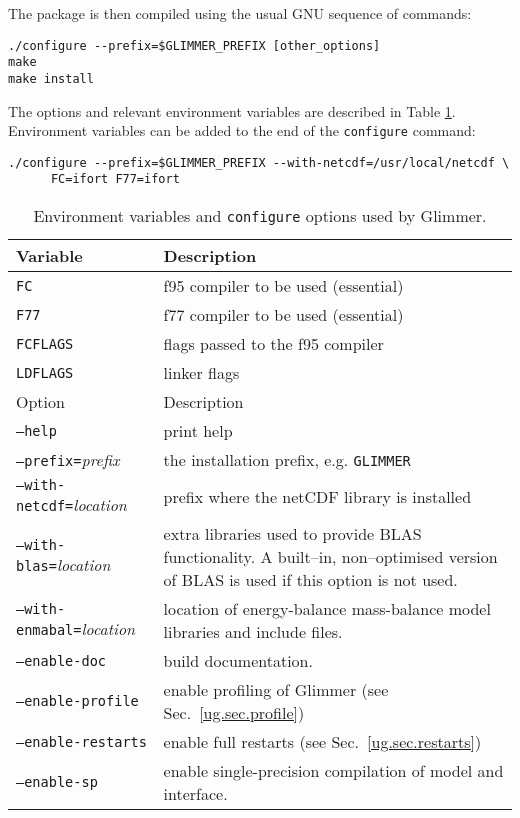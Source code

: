 The package is then compiled using the usual GNU sequence of commands:
\begin{verbatim}
./configure --prefix=$GLIMMER_PREFIX [other_options]
make
make install
\end{verbatim} %
%
The options and relevant environment variables are described in Table
\ref{ug.tab.env}. Environment variables can be added to the end of the
\texttt{configure} command:
%
\begin{verbatim}
./configure --prefix=$GLIMMER_PREFIX --with-netcdf=/usr/local/netcdf \
      FC=ifort F77=ifort
\end{verbatim} %
%
\begin{table}[htbp]
  \centering
  \begin{tabular}{|l|p{8cm}|}
    \hline
    Variable & Description \\
    \hline
    \texttt{FC} & f95 compiler to be used (essential)\\
    \texttt{F77} & f77 compiler to be used (essential) \\
    \texttt{FCFLAGS} & flags passed to the f95 compiler \\
    \texttt{LDFLAGS} & linker flags\\
    \hline
    Option  & Description \\
    \hline
    \texttt{--help} & print help \\
    \texttt{--prefix=}{\it prefix} & the installation prefix,
    e.g. \texttt{GLIMMER} \\ 
    \texttt{--with-netcdf=}{\it location} & prefix where the netCDF
    library is installed \\ 
    \texttt{--with-blas=}{\it location} & extra libraries used to
    provide BLAS functionality. A built--in, non--optimised version of
    BLAS is used if this option is not used. \\ 
    \texttt{--with-enmabal=}{\it location} & location of
    energy-balance mass-balance model libraries and include files. \\ 
    \texttt{--enable-doc} & build documentation.\\
    \texttt{--enable-profile} & enable profiling of Glimmer (see
    Sec.~\ref{ug.sec.profile})\\ 
    \texttt{--enable-restarts} & enable full restarts (see
    Sec.~\ref{ug.sec.restarts})\\ 
    \texttt{--enable-sp} & enable single-precision compilation of
    model and interface. \\
    \hline
  \end{tabular}
  \caption{Environment variables and \texttt{configure} options used
  by Glimmer.} 
  \label{ug.tab.env}
\end{table}
%
